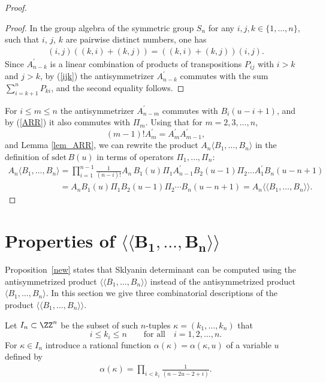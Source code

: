\begin{proof}
\begin{proof}
In the group algebra of the symmetric group  $S_n$ for any $i,j,k\in\{1,\dots, n\}$, such that $i$, $j$, $k$ are pairwise distinct numbers, one has
\begin{gather}\label{ijk}
(i,j)((k,i)+(k,j))=((k,i)+(k,j))(i,j).
\end{gather}
Since $A^{\prime}_{n-k}$ is a linear combination of products of  transpositions $P_{ij}$ with  $i>k$ and $ j>k $,  by (\ref{ijk})  the antisymmetrizer  $A^{\prime}_{n-k}$ commutes with the sum $\sum_{i=k+1}^{n}P_{ki}$, and the second equality follows.
\end{proof}

 For  $i\le m\le n$ the antisymmetrizer $A^{\prime}_{n-m}$ commutes with $B_i(u-i+1)$,
and by (\ref{ARR}) it also commutes with $\Pi_m$.
Using that for $m=2, 3,\dots, n $,
\[
(m-1)!A^{\prime}_m=A^{\prime}_mA^{\prime}_{m-1},
\]
and Lemma \ref{lem_ARR}, we can   rewrite the product  $A_n \langle  B_1, \dots, B_n\rangle $ in  the def\/inition of $\text{sdet}\, B(u)$ in terms of operators $\Pi_1,\dots, \Pi_n$:
 \begin{gather*}
 A_n \langle  B_1, \dots, B_n\rangle
=  { \prod_{i=1}^{n-1}\frac{1}{(n-i)!}}
   A_n\,B_1(u) \Pi_1A^{\prime}_{n-1}B_2(u-1)\Pi_2\dots A^{\prime}_{1}
B_n(u-n+1)\\
\phantom{A_n \langle  B_1, \dots, B_n\rangle   }{}
=  A_n B_1(u) \Pi_1B_2(u-1)\Pi_2 \cdots
B_n(u-n+1)=A_n \langle \langle  B_1, \dots, B_n\rangle \rangle .\tag*{\qed}
\end{gather*}
\renewcommand{\qed}{}
\end{proof}

\section[Properties of $\langle \langle  B_1, \dots, B_n\rangle \rangle $]{Properties of $\boldsymbol{\langle \langle  B_1, \dots, B_n\rangle \rangle }$}\label{section3}

Proposition~\ref{new}  states that Sklyanin determinant  can be computed  using the  antisymmetrized product  $\langle \langle  B_1, \dots, B_n\rangle \rangle $ instead of the antisymmetrized  product   $\langle  B_1, \dots, B_n\rangle $. In this section   we  give three  combinatorial  descriptions of the product $\langle \langle  B_1, \dots, B_n\rangle \rangle $.

Let $I_n\subset \ZZ^n$  be the subset of such $n$-tuples $\kappa=(k_1, \dots, k_n)$ that
\[
i\le k_i\le n \qquad \text{for all}\quad i=1,2,\dots, n.
\]
 For $\kappa\in I_n$ introduce  a rational function $\alpha{(\kappa)}=\alpha{(\kappa,u)}$ of   a variable $u$ def\/ined by
\begin{gather*}%
\alpha{(\kappa)}=
{\prod_{i< k_{i}} \frac{1}{(n-2u-2+i)}}.
\end{gather*}


